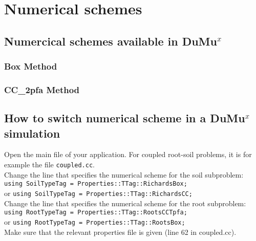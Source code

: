 \chapter*{Numerical schemes}

\section*{Numercical schemes available in DuMu$^x$}

\subsection*{Box Method}

\subsection*{CC_2pfa Method}

\section*{How to switch numerical scheme in a DuMu$^x$ simulation}

Open the main file of your application. For coupled root-soil problems, it is for example the file \lstinline{coupled.cc}. \\
Change the line that specifies the numerical scheme for the soil subproblem:\\
\lstinline{using SoilTypeTag = Properties::TTag::RichardsBox;}\\
or
\lstinline{using SoilTypeTag = Properties::TTag::RichardsCC;}\\

Change the line that specifies the numerical scheme for the root subproblem:\\
\lstinline{using RootTypeTag = Properties::TTag::RootsCCTpfa;}\\
or 
\lstinline{using RootTypeTag = Properties::TTag::RootsBox;}\\

Make sure that the relevant properties file is given (line 62 in coupled.cc). 


